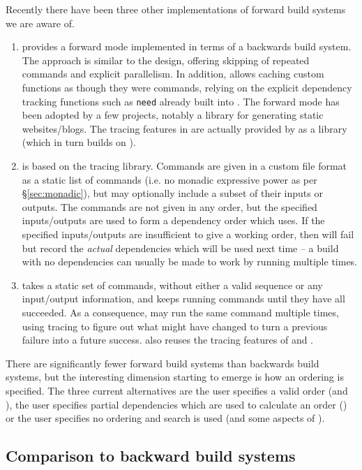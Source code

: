 Recently there have been three other implementations of forward build systems we are aware of.

\begin{enumerate}
\item \Shake \cite{shake} provides a forward mode implemented in terms of a backwards build system. The approach is similar to the \Fabricate design, offering skipping of repeated commands and explicit parallelism. In addition, \Shake allows caching custom functions as though they were commands, relying on the explicit dependency tracking functions such as \texttt{need} already built into \Shake. The forward mode has been adopted by a few projects, notably a library for generating static websites/blogs. The tracing features in \Rattle are actually provided by \Shake as a library (which in turn builds on \Fsatrace).
\item \Fac \cite{fac} is based on the \Bigbro tracing library. Commands are given in a custom file format as a static list of commands (i.e. no monadic expressive power as per \S\ref{sec:monadic}), but may optionally include a subset of their inputs or outputs. The commands are not given in any order, but the specified inputs/outputs are used to form a dependency order which \Fac uses. If the specified inputs/outputs are insufficient to give a working order, then \Fac will fail but record the \emph{actual} dependencies which will be used next time -- a build with no dependencies can usually be made to work by running \Fac multiple times.
\item \Stroll \cite{stroll} takes a static set of commands, without either a valid sequence or any input/output information, and keeps running commands until they have all succeeded. As a consequence, \Stroll may run the same command multiple times, using tracing to figure out what might have changed to turn a previous failure into a future success. \Stroll also reuses the tracing features of \Shake and \Fsatrace.
\end{enumerate}

There are significantly fewer forward build systems than backwards build systems, but the interesting dimension starting to emerge is how an ordering is specified. The three current alternatives are the user specifies a valid order (\Fabricate and \Rattle), the user specifies partial dependencies which are used to calculate an order (\Fac) or the user specifies no ordering and search is used (\Stroll and some aspects of \Fac).

\subsection{Comparison to backward build systems}
\label{sec:remote_execution}

